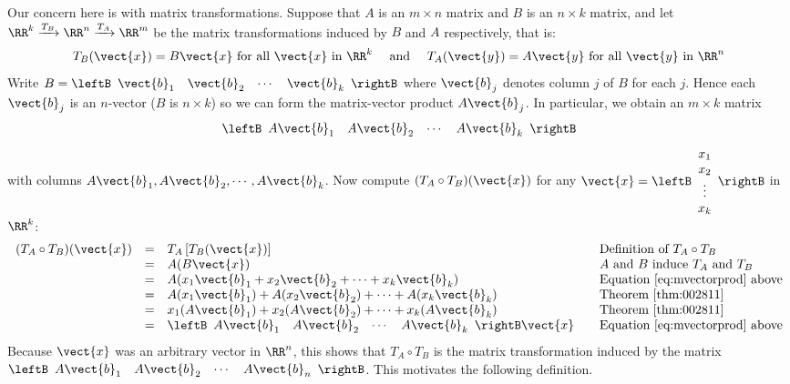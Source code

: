 Our concern here is with matrix transformations. Suppose that $A$ is an $m \times n$ matrix and $B$ is an $n \times k$ matrix, and let $\RR^{k} \xrightarrow{T_{B}} \RR^{n} \xrightarrow{T_{A}} \RR^{m}$ be the matrix transformations induced by $B$ and $A$ respectively, that is:
\begin{equation*}
T_{B}(\vect{x}) = B\vect{x} \mbox{ for all } \vect{x} \mbox{ in } \RR^{k} \quad \mbox{ and } \quad T_{A}(\vect{y}) = A\vect{y} \mbox{ for all } \vect{y} \mbox{ in } \RR^{n}
\end{equation*}
Write $B = \leftB \begin{array}{cccc}
\vect{b}_{1} & \vect{b}_{2} & \cdots & \vect{b}_{k}
\end{array} \rightB$ where $\vect{b}_{j}$ denotes column $j$ of $B$ for each $j$. Hence each $\vect{b}_{j}$ is an $n$-vector ($B$ is $n \times k$) so we can form the matrix-vector product $A\vect{b}_{j}$. In particular, we obtain an $m \times k$ matrix
\begin{equation*}
\leftB \begin{array}{cccc}
A\vect{b}_{1} & A\vect{b}_{2} & \cdots & A\vect{b}_{k}
\end{array} \rightB
\end{equation*}
with columns $A\vect{b}_{1}, A\vect{b}_{2}, \cdots, A\vect{b}_{k}$. Now compute $(T_{A} \circ T_{B})(\vect{x})$ for any $\vect{x} = \leftB \begin{array}{c}
x_{1} \\
x_{2} \\
\vdots \\
x_{k}
\end{array} \rightB$ in $\RR^k$:
\begin{equation*}
\begin{array}{lllll}
(T_{A} \circ T_{B})(\vect{x}) & = & T_{A} \left[ T_{B}(\vect{x}) \right] & & \mbox{Definition of } T_{A} \circ T_{B} \\
& = & A(B\vect{x}) & & A \mbox{ and } B \mbox{ induce } T_{A} \mbox{ and } T_{B} \\
& = & A(x_{1}\vect{b}_{1} + x_{2}\vect{b}_{2} + \cdots + x_{k}\vect{b}_{k}) & & \mbox{Equation~\ref{eq:mvectorprod} above} \\
& = & A(x_{1}\vect{b}_{1}) + A(x_{2}\vect{b}_{2}) + \cdots + A(x_{k}\vect{b}_{k}) & & \mbox{Theorem~\ref{thm:002811}} \\
& = & x_{1}(A\vect{b}_{1}) + x_{2}(A\vect{b}_{2}) + \cdots + x_{k}(A\vect{b}_{k}) & & \mbox{Theorem~\ref{thm:002811}} \\
& = & \leftB \begin{array}{cccc}
	A\vect{b}_{1} & A\vect{b}_{2} & \cdots & A\vect{b}_{k}
	\end{array} \rightB \vect{x} & & \mbox{Equation~\ref{eq:mvectorprod} above}
\end{array}
\end{equation*}
Because $\vect{x}$ was an arbitrary vector in $\RR^n$, this shows that $T_{A} \circ T_{B}$ is the matrix transformation induced by the matrix $\leftB \begin{array}{cccc} A\vect{b}_{1} &  A\vect{b}_{2} & \cdots  & A\vect{b}_{n} \end{array} \rightB$. This motivates the following definition.



